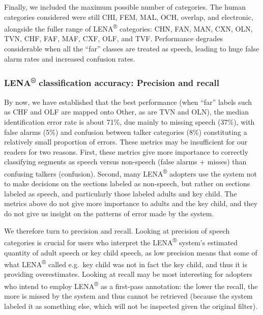 \documentclass[english,table,man,floatsintext]{apa6}
\begin{document}
Finally, we included the maximum possible number of categories. The
human categories considered were still CHI, FEM, MAL, OCH, overlap, and
electronic, alongside the fuller range of LENA\textsuperscript{®}
categories: CHN, FAN, MAN, CXN, OLN, TVN, CHF, FAF, MAF, CXF, OLF, and
TVF. Performance degrades considerable when all the \enquote{far}
classes are treated as speech, leading to huge false alarm rates and
increased confusion rates.

\subsubsection{\texorpdfstring{LENA\textsuperscript{®} classification
accuracy: Precision and
recall}{LENA® classification accuracy: Precision and recall}}\label{lena-classification-accuracy-precision-and-recall}

By now, we have established that the best performance (when
\enquote{far} labels such as CHF and OLF are mapped onto Other, as are
TVN and OLN), the median identification error rate is about 71\%, due
mainly to missing speech (37\%), with false alarms (5\%) and confusion
between talker categories (8\%) constituting a relatively small
proportion of errors. These metrics may be insufficient for our readers
for two reasons. First, these metrics give more importance to correctly
classifying segments as speech versus non-speech (false alarms + misses)
than confusing talkers (confusion). Second, many LENA\textsuperscript{®}
adopters use the system not to make decisions on the sections labeled as
non-speech, but rather on sections labeled as speech, and particularly
those labeled adults and key child. The metrics above do not give more
importance to adults and the key child, and they do not give us insight
on the patterns of error made by the system.

We therefore turn to precision and recall. Looking at precision of
speech categories is crucial for users who interpret the
LENA\textsuperscript{®} system's estimated quantity of adult speech or
key child speech, as low precision means that some of what
LENA\textsuperscript{®} called e.g.~key child was not in fact the key
child, and thus it is providing overestimates. Looking at recall may be
most interesting for adopters who intend to employ
LENA\textsuperscript{®} as a first-pass annotation: the lower the
recall, the more is missed by the system and thus cannot be retrieved
(because the system labeled it as something else, which will not be
inspected given the original filter).
\end{document}
